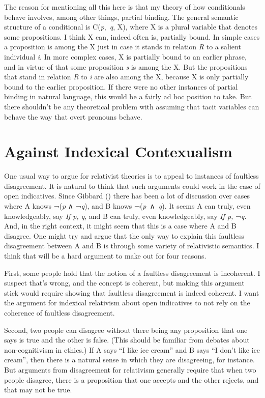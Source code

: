\documentclass[
  10pt,
  letterpaper,
  DIV=11,
  numbers=noendperiod,
  twoside]{scrartcl}
\begin{document}
The reason for mentioning all this here is that my theory of how
conditionals behave involves, among other things, partial binding. The
general semantic structure of a conditional is C(\emph{p},~\emph{q}, X),
where X is a plural variable that denotes some propositions. I think X
can, indeed often is, partially bound. In simple cases a proposition is
among the X just in case it stands in relation \emph{R} to a salient
individual \emph{i}. In more complex cases, X is partially bound to an
earlier phrase, and in virtue of that some proposition \emph{s} is among
the X. But the propositions that stand in relation \emph{R} to \emph{i}
are also among the X, because X is only partially bound to the earlier
proposition. If there were no other instances of partial binding in
natural language, this would be a fairly ad hoc position to take. But
there shouldn't be any theoretical problem with assuming that tacit
variables can behave the way that overt pronouns behave.

\section{Against Indexical
Contexualism}\label{against-indexical-contexualism}

One usual way to argue for relativist theories is to appeal to instances
of faultless disagreement. It is natural to think that such arguments
could work in the case of open indicatives. Since Gibbard
() there has been a lot of discussion
over cases where A knows ¬(\emph{p} ∧ ¬\emph{q}), and B knows
¬(\emph{p}~∧~\emph{q}). It seems A can truly, even knowledgeably, say
\emph{If p, q}, and B can truly, even knowledgeably, say \emph{If p,}
¬\emph{q}. And, in the right context, it might seem that this is a case
where A and B disagree. One might try and argue that the only way to
explain this faultless disagreement between A and B is through some
variety of relativistic semantics. I think that will be a hard argument
to make out for four reasons.

First, some people hold that the notion of a faultless disagreement is
incoherent. I suspect that's wrong, and the concept is coherent, but
making this argument stick would require showing that faultless
disagreement is indeed coherent. I want the argument for indexical
relativism about open indicatives to not rely on the coherence of
faultless disagreement.

Second, two people can disagree without there being any proposition that
one says is true and the other is false. (This should be familiar from
debates about non-cognitivism in ethics.) If A says ``I like ice cream''
and B says ``I don't like ice cream'', then there is a natural sense in
which they are disagreeing, for instance. But arguments from
disagreement for relativism generally require that when two people
disagree, there is a proposition that one accepts and the other rejects,
and that may not be true.
\end{document}
